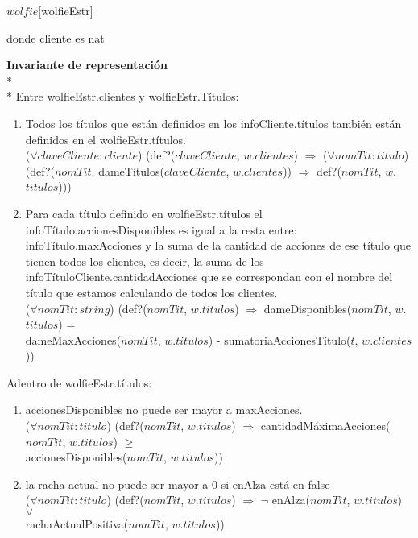 \begin{Representacion}
\begin{Estructura}{$wolfie$}[wolfieEstr]
    \par donde cliente es nat
        
  \end{Estructura}
  \textbf{Invariante de representación}\\* \\* Entre wolfieEstr.clientes y wolfieEstr.Títulos:
 \begin{enumerate}
 	\item Todos los títulos que están definidos en los infoCliente.títulos también están definidos en el wolfieEstr.títulos.\\
    ($\forall claveCliente:cliente$) (def?($claveCliente$, $w$.$clientes$) $\Rightarrow$ ($\forall nomTit:titulo$)\\ (def?($nomTit$, dameTítulos($claveCliente$, $w$.$clientes$)) $\Rightarrow$ def?($nomTit$, $w$.$titulos$)))
    \item Para cada título definido en wolfieEstr.títulos el infoTítulo.accionesDisponibles es igual a la resta entre: infoTítulo.maxAcciones y la suma de la cantidad de acciones de ese título que tienen todos los clientes, es decir, la suma de los infoTítuloCliente.cantidadAcciones que se correspondan con el nombre del título que estamos calculando de todos los clientes.\\
    ($\forall nomTit:string$) (def?($nomTit$, $w$.$titulos$) $\Rightarrow$ dameDisponibles($nomTit$, $w$.$titulos$) = \\dameMaxAcciones($nomTit$, $w$.$titulos$) - sumatoriaAccionesTítulo($t$, $w$.$clientes$))
    
 \end{enumerate}
 Adentro de wolfieEstr.títulos:
 \begin{enumerate}
 	\item accionesDisponibles no puede ser mayor a maxAcciones.\\
    ($\forall nomTit:titulo$) (def?($nomTit$, $w$.$titulos$) $\Rightarrow$ cantidadMáximaAcciones($nomTit$, $w.titulos$) $\ge$\\ accionesDisponibles($nomTit$, $w.titulos$))
    \item la racha actual no puede ser mayor a 0 si enAlza está en false\\
    ($\forall nomTit:titulo$) (def?($nomTit$, $w$.$titulos$) $\Rightarrow$ $\neg$ enAlza($nomTit$, $w.titulos$) $\lor$\\ rachaActualPositiva($nomTit$, $w.titulos$))
    

\end{enumerate}
\end{Representacion}
